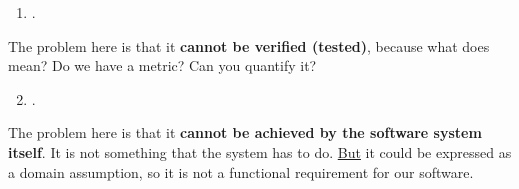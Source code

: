 \begin{examplebox}
    \begin{enumerate}
        \item {}.
    \end{enumerate}
    The problem here is that it \textbf{cannot be verified (tested)}, because what does  mean? Do we have a metric? Can you quantify it?

    \begin{enumerate}
        \setcounter{enumi}{1}
        \item {}.
    \end{enumerate}
    The problem here is that it \textbf{cannot be achieved by the software system itself}. It is not something that the system has to do. \underline{But} it could be expressed as a domain assumption, so it is not a functional requirement for our software.
\end{examplebox}